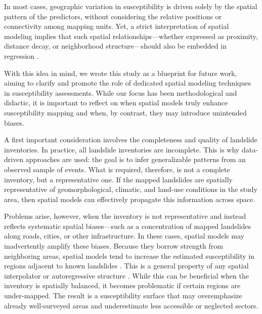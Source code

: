 \documentclass[lineno,pdflatex,sn-basic]{sn-jnl}%
\theoremstyle{thmstyleone}%
\theoremstyle{thmstyletwo}%
\theoremstyle{thmstylethree}%
\begin{document}
In most cases, geographic variation in susceptibility is driven solely by the spatial pattern of the predictors, without considering the relative positions or connectivity among mapping units. Yet, a strict interpretation of spatial modeling implies that such spatial relationships—whether expressed as proximity, distance decay, or neighborhood structure—should also be embedded in regression \citep{bryce2022unified}.

With this idea in mind, we wrote this study as a blueprint for future work, aiming to clarify and promote the role of dedicated spatial modeling techniques in susceptibility assessments. 
While our focus has been methodological and didactic, it is important to reflect on when spatial models truly enhance susceptibility mapping and when, by contrast, they may introduce unintended biases.

A first important consideration involves the completeness and quality of landslide inventories. In practice, all landslide inventories are incomplete. 
This is why data-driven approaches are used: the goal is to infer generalizable patterns from an observed sample of events. What is required, therefore, is not a complete inventory, but a representative one. 
If the mapped landslides are spatially representative of geomorphological, climatic, and land-use conditions in the study area, then spatial models can effectively propagate this information across space.

Problems arise, however, when the inventory is not representative and instead reflects systematic spatial biases—such as a concentration of mapped landslides along roads, cities, or other infrastructure. 
In these cases, spatial models may inadvertently amplify these biases. 
Because they borrow strength from neighboring areas, spatial models tend to increase the estimated susceptibility in regions adjacent to known landslides \citep{caleca2025pan}. 
This is a general property of any spatial interpolator or autoregressive structure \citep{wheeler2021geographically}. 
While this can be beneficial when the inventory is spatially balanced, it becomes problematic if certain regions are under-mapped. 
The result is a susceptibility surface that may overemphasize already well-surveyed areas and underestimate less accessible or neglected sectors.
\end{document}
